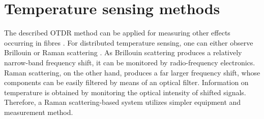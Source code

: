 \documentclass{standalone}
\begin{document}
\section{Temperature sensing methods}

The described OTDR method can be applied for measuring other effects occurring in fibres \cite{spie1991}\cite{sensorRealization2008}. For distributed temperature sensing, one can either observe Brillouin or Raman scattering \cite{epflBookInelastic}. As Brillouin scattering produces a relatively narrow-band frequency shift, it can be monitored by radio-frequency electronics. Raman scattering, on the other hand, produces a far larger frequency shift, whose components can be easily filtered by means of an optical filter. Information on temperature is obtained by monitoring the optical intensity of shifted signals. Therefore, a Raman scattering-based system utilizes simpler equipment and measurement method. \\
\end{document}
